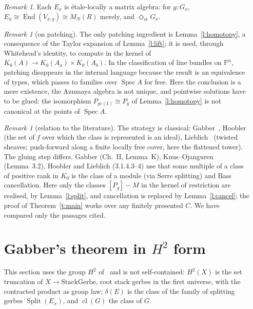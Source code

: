 \documentclass[11pt]{amsart}
\theoremstyle{definition}
\theoremstyle{remark}
\newtheorem{remark}[theorem]{Remark}
\newcommand{\Spec}{\operatorname{Spec}}
\newcommand{\End}{\operatorname{End}}
\newcommand{\Split}{\operatorname{Split}}
\newcommand{\cl}{\operatorname{cl}}
\newcommand{\closeE}{\Diamond_{\mathrm{et}}}
\newcommand{\Mat}{M_N(R)}
\begin{document}
\begin{remark}
Each $E_x$ is \'etale-locally a matrix algebra: for $g:G_x$,
$E_x\cong\End(V_{x,g})\cong\Mat$ merely, and $\closeE G_x$.
\end{remark}

\begin{remark}[on patching]
The only patching ingredient is Lemma~\ref{l:homotopy}, a consequence of
the Taylor expansion of Lemma~\ref{l:lift}; it is used, through
Whitehead's identity, to compute in the kernel of
$K_0(A)\to K_0(A_a)\times K_0(A_b)$. In the classification of line bundles
on $\mathbb P^n$, patching disappears in the internal language because the
result is an equivalence of types, which passes to families over $\Spec A$
for free. Here the conclusion is a mere existence, the Azumaya algebra is
not unique, and pointwise solutions have to be glued: the isomorphism
$P_{g\varepsilon(1)}\cong P_g$ of Lemma~\ref{l:homotopy} is not
canonical at the points of $\Spec A$.
\end{remark}

\begin{remark}[relation to the literature]
The strategy is classical: Gabber~\cite{Gabber}, Hoobler~\cite{Hoobler80,
Hoobler} (the set of $f$ over which the class is represented is an ideal),
Lieblich~\cite{Lieblich} (twisted sheaves; push-forward along a finite
locally free cover, here the flattened tower). The gluing step differs.
Gabber (Ch.~II, Lemma~K), Knus--Ojanguren~\cite{KO} (Lemma~3.2), Hoobler
and Lieblich (3.1.4.3--4) use that some multiple of a class of positive
rank in $K_0$ is the class of a module (via Serre splitting) and Bass
cancellation. Here only the classes $[P_g]-M$ in the kernel of restriction
are realised, by Lemma~\ref{l:split}, and cancellation is replaced by
Lemma~\ref{l:cancel}; the proof of Theorem~\ref{t:main} works over any
finitely presented $C$. We have compared only the passages cited.
\end{remark}

\section{Gabber's theorem in \texorpdfstring{$H^2$}{H2} form}

This section uses the group $H^2$ of~\cite{h2} and is not self-contained:
$H^2(X)$ is the set truncation of $X\to\mathrm{StackGerbe}$, root stack
gerbes in the first universe, with the contracted product as group law;
$\delta(E)$ is the class of the family of splitting gerbes $\Split(E_x)$,
and $\cl(G)$ the class of $G$.
\end{document}
